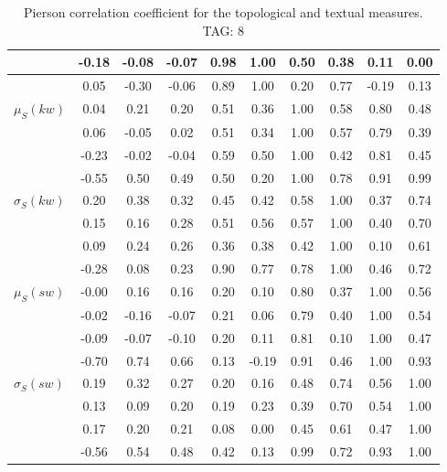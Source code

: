 \begin{table*}[h!]
\begin{center}
\begin{tabular}{| l | c | c | c | c | c | c | c | c | c |}
 & -0.18  & -0.08  & -0.07  & 0.98  & 1.00  & 0.50  & 0.38  & 0.11  & 0.00 \\\hline
 & 0.05  & -0.30  & -0.06  & 0.89  & 1.00  & 0.20  & 0.77  & -0.19  & 0.13 \\\hline
$\mu_S(kw)$ & 0.04  & 0.21  & 0.20  & 0.51  & 0.36  & 1.00  & 0.58  & 0.80  & 0.48 \\\hline
 & 0.06  & -0.05  & 0.02  & 0.51  & 0.34  & 1.00  & 0.57  & 0.79  & 0.39 \\\hline
 & -0.23  & -0.02  & -0.04  & 0.59  & 0.50  & 1.00  & 0.42  & 0.81  & 0.45 \\\hline
 & -0.55  & 0.50  & 0.49  & 0.50  & 0.20  & 1.00  & 0.78  & 0.91  & 0.99 \\\hline
$\sigma_S(kw)$ & 0.20  & 0.38  & 0.32  & 0.45  & 0.42  & 0.58  & 1.00  & 0.37  & 0.74 \\\hline
 & 0.15  & 0.16  & 0.28  & 0.51  & 0.56  & 0.57  & 1.00  & 0.40  & 0.70 \\\hline
 & 0.09  & 0.24  & 0.26  & 0.36  & 0.38  & 0.42  & 1.00  & 0.10  & 0.61 \\\hline
 & -0.28  & 0.08  & 0.23  & 0.90  & 0.77  & 0.78  & 1.00  & 0.46  & 0.72 \\\hline
$\mu_S(sw)$ & -0.00  & 0.16  & 0.16  & 0.20  & 0.10  & 0.80  & 0.37  & 1.00  & 0.56 \\\hline
 & -0.02  & -0.16  & -0.07  & 0.21  & 0.06  & 0.79  & 0.40  & 1.00  & 0.54 \\\hline
 & -0.09  & -0.07  & -0.10  & 0.20  & 0.11  & 0.81  & 0.10  & 1.00  & 0.47 \\\hline
 & -0.70  & 0.74  & 0.66  & 0.13  & -0.19  & 0.91  & 0.46  & 1.00  & 0.93 \\\hline
$\sigma_S(sw)$ & 0.19  & 0.32  & 0.27  & 0.20  & 0.16  & 0.48  & 0.74  & 0.56  & 1.00 \\\hline
 & 0.13  & 0.09  & 0.20  & 0.19  & 0.23  & 0.39  & 0.70  & 0.54  & 1.00 \\\hline
 & 0.17  & 0.20  & 0.21  & 0.08  & 0.00  & 0.45  & 0.61  & 0.47  & 1.00 \\\hline
 & -0.56  & 0.54  & 0.48  & 0.42  & 0.13  & 0.99  & 0.72  & 0.93  & 1.00 \\\hline
\end{tabular}
\caption{Pierson correlation coefficient for the topological and textual measures. TAG: 8}
\end{center}
\end{table*}